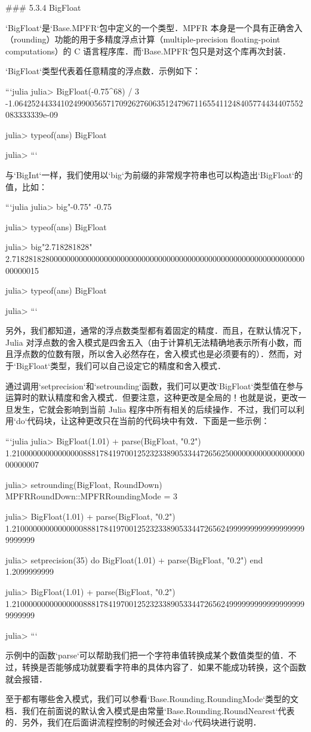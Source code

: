 ### 5.3.4 BigFloat

`BigFloat`是`Base.MPFR`包中定义的一个类型．MPFR 本身是一个具有正确舍入（rounding）功能的用于多精度浮点计算（multiple-precision floating-point computations）的 C 语言程序库．而`Base.MPFR`包只是对这个库再次封装．

`BigFloat`类型代表着任意精度的浮点数．示例如下：

```julia
julia> BigFloat(-0.75^68) / 3
-1.064252443341024990056571709262760635124796711655411248405774434407552083333339e-09

julia> typeof(ans)
BigFloat

julia> 
```

与`BigInt`一样，我们使用以`big`为前缀的非常规字符串也可以构造出`BigFloat`的值，比如：

```julia
julia> big"-0.75"
-0.75

julia> typeof(ans)
BigFloat

julia> big"2.718281828"
2.718281828000000000000000000000000000000000000000000000000000000000000000000015

julia> typeof(ans)
BigFloat

julia> 
```

另外，我们都知道，通常的浮点数类型都有着固定的精度．而且，在默认情况下，Julia 对浮点数的舍入模式是四舍五入（由于计算机无法精确地表示所有小数，而且浮点数的位数有限，所以舍入必然存在，舍入模式也是必须要有的）．然而，对于`BigFloat`类型，我们可以自己设定它的精度和舍入模式．

通过调用`setprecision`和`setrounding`函数，我们可以更改`BigFloat`类型值在参与运算时的默认精度和舍入模式．但要注意，这种更改是全局的！也就是说，更改一旦发生，它就会影响到当前 Julia 程序中所有相关的后续操作．不过，我们可以利用`do`代码块，让这种更改只在当前的代码块中有效．下面是一些示例：

```julia
julia> BigFloat(1.01) + parse(BigFloat, "0.2")
1.210000000000000008881784197001252323389053344726562500000000000000000000000007

julia> setrounding(BigFloat, RoundDown)
MPFRRoundDown::MPFRRoundingMode = 3

julia> BigFloat(1.01) + parse(BigFloat, "0.2")
1.21000000000000000888178419700125232338905334472656249999999999999999999999999

julia> setprecision(35) do 
           BigFloat(1.01) + parse(BigFloat, "0.2") 
       end
1.2099999999

julia> BigFloat(1.01) + parse(BigFloat, "0.2") 
1.21000000000000000888178419700125232338905334472656249999999999999999999999999

julia> 
```

示例中的函数`parse`可以帮助我们把一个字符串值转换成某个数值类型的值．不过，转换是否能够成功就要看字符串的具体内容了．如果不能成功转换，这个函数就会报错．

至于都有哪些舍入模式，我们可以参看`Base.Rounding.RoundingMode`类型的文档．我们在前面说的默认舍入模式是由常量`Base.Rounding.RoundNearest`代表的．另外，我们在后面讲流程控制的时候还会对`do`代码块进行说明．